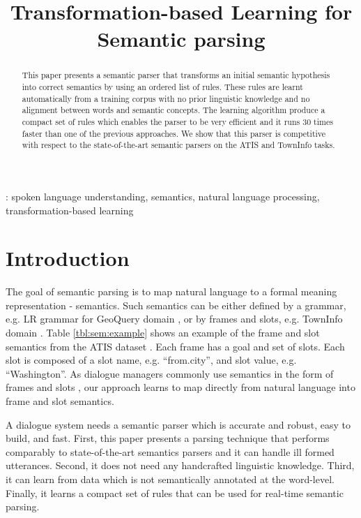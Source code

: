 \documentclass{article}
\title{Transformation-based Learning for Semantic parsing}
\begin{document}
\maketitle
%
\begin{abstract}
This paper presents a semantic parser that transforms an initial semantic hypothesis into correct semantics by using an ordered list of rules. These rules are learnt automatically from a training corpus with no prior linguistic knowledge and no alignment between words and semantic concepts. The learning algorithm produce a compact set of rules which enables the parser to be very efficient and it runs 30 times faster than one of the previous approaches. We show that this parser is competitive with respect to the state-of-the-art semantic parsers on the ATIS and TownInfo tasks.
\end{abstract}
\vspace{0.1cm}
: spoken language understanding, semantics, natural language processing, transformation-based learning


\section{Introduction}
The goal of semantic parsing is to map natural language to a formal meaning representation - semantics. Such semantics can be either defined by a grammar, e.g. LR grammar for GeoQuery domain \cite{kate05}, or by frames and slots, e.g. TownInfo domain \cite{mairesse09}. Table \ref{tbl:sem:example} shows an example of the frame and slot semantics from the ATIS dataset \cite{atis94}. Each frame has a goal and set of slots. Each slot is composed of a slot name, e.g. ``from.city'',
and slot value, e.g. ``Washington''. As dialogue managers commonly use semantics in the form of frames and slots \cite{williams07,thomson08}, our approach learns to map directly from natural language into frame and slot semantics.


A dialogue system needs a semantic parser which is accurate and robust, easy to build, and fast. First, this paper presents a parsing technique that performs comparably to state-of-the-art semantics parsers and it can handle ill formed utterances. Second, it does not need any handcrafted linguistic knowledge. Third, it can learn from data which is not semantically annotated at the word-level. Finally, it learns a compact set of rules that can be used for real-time semantic parsing.
\end{document}
